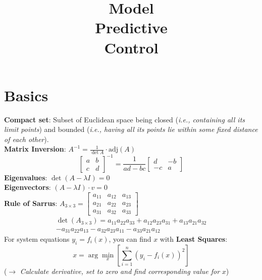 \documentclass[english]{latex4ei/latex4ei_sheet}
\title{Model\\Predictive\\Control}
\begin{document}
\maketitle	%

\section{Basics}
\begin{sectionbox}
\textbf{Compact set}: Subset of Euclidean space being closed (\textit{i.e., containing all its limit points}) and bounded (\textit{i.e., having all its points lie within some fixed distance of each other}).\\
\textbf{Matrix Inversion}: $A^{-1}=\frac{1}{\det{A}}\cdot\textrm{adj}(A)$
$$\begin{bmatrix}a & b \\ c & d\end{bmatrix}^{-1} = \frac{1}{ad-bc} \begin{bmatrix}d & -b \\ -c & a\end{bmatrix}$$
\textbf{Eigenvalues}: $\det(A-\lambda I)=0$\\
\textbf{Eigenvectors}: $(A-\lambda I)\cdot v=0$\\
\textbf{Rule of Sarrus}: $A_{3\times3}=\begin{bmatrix}a_{11} & a_{12} & a_{13} \\ a_{21} & a_{22} & a_{23} \\ a_{31} & a_{32} & a_{33} \end{bmatrix}$
\begin{multline*}
    \det(A_{3\times3})=a_{11}a_{22}a_{33}+a_{12}a_{23}a_{31}+a_{13}a_{21}a_{32}\\-a_{31}a_{22}a_{13}-a_{32}a_{23}a_{11}-a_{33}a_{21}a_{12}
\end{multline*}
For system equations $y_i=f_i(x)$, you can find $x$ with \textbf{Least Squares}: \\ $$x=\arg \min_{x} \left[\sum\limits_{i=1}^{n}\left(y_i-f_i(x)\right)^2\right]$$
($\rightarrow$ \textit{Calculate derivative, set to zero and find corresponding value for} $x$)

\end{sectionbox}
\end{document}
